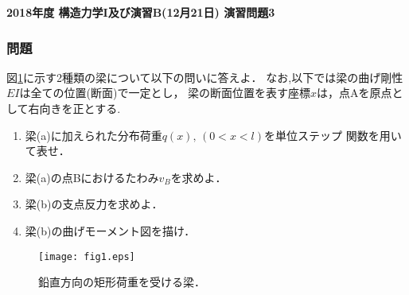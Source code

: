 \documentclass[10pt,a4j]{jarticle}
\newlength{\minitwocolumn}
\begin{document}
\newcommand{\fat}[1]{\mbox{\boldmath $#1$}}
\newcommand{\D}{\partial}
\newcommand{\w}{\omega}
\newcommand{\ga}{\alpha}
\newcommand{\gb}{\beta}
\newcommand{\gx}{\xi}
\newcommand{\gz}{\zeta}
\newcommand{\vhat}[1]{\hat{\fat{#1}}}
\newcommand{\spc}{\vspace{0.7\baselineskip}}
\newcommand{\halfspc}{\vspace{0.3\baselineskip}}

\pagestyle{empty}
\newcommand{\twofig}[2]
 {
   \begin{figure}[h]
     \begin{minipage}[t]{\minitwocolumn}
         \begin{center}   #1
         \end{center}
     \end{minipage}
         \hspace{\columnsep}
     \begin{minipage}[t]{\minitwocolumn}
         \begin{center} #2
         \end{center}
     \end{minipage}
   \end{figure}
 }
\begin{center}
{\Large \bf 2018年度 構造力学I及び演習B(12月21日) 演習問題3} \\
\end{center}
\subsubsection*{問題}
図\ref{fig:fig1}に示す2種類の梁について以下の問いに答えよ．
なお,以下では梁の曲げ剛性$EI$は全ての位置(断面)で一定とし，
梁の断面位置を表す座標$x$は，点Aを原点として右向きを正とする. 
\begin{enumerate}
\item
	梁(a)に加えられた分布荷重$q(x), \, (0 < x < l)$を単位ステップ
	関数を用いて表せ．
\item
	梁(a)の点Bにおけるたわみ$v_B$を求めよ．
\item
    	梁(b)の支点反力を求めよ．
\item
	梁(b)の曲げモーメント図を描け．
\end{enumerate}
\begin{figure}[h]
	\begin{center}
	\texttt{[image: fig1.eps]} 
	\end{center}
	\caption{鉛直方向の矩形荷重を受ける梁．}
	\label{fig:fig1}
\end{figure}
\end{document}
